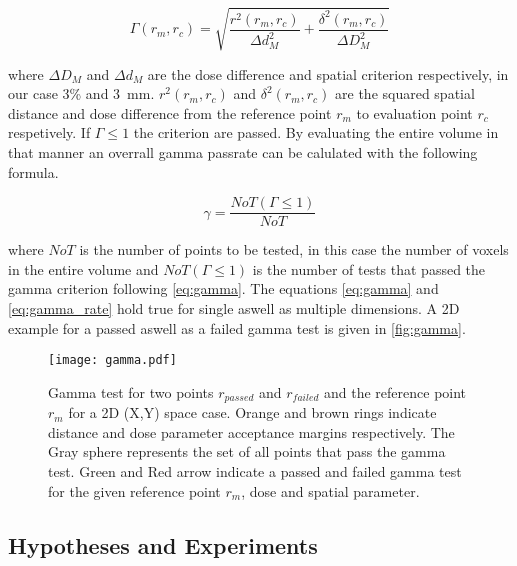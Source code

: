 \begin{equation}\label{eq:gamma}
    \Gamma (r_m, r_c) = \sqrt{\frac{r^2(r_m,r_c)}{\Delta d^2_M} + \frac{\delta ^2(r_m,r_c)}{\Delta D^2_M}}
\end{equation}

where $\Delta D_M$ and $\Delta d_M$ are the dose difference and spatial criterion respectively, in our case 3\% and 3~mm.  $r^2(r_m,r_c)$ and $\delta ^2(r_m,r_c)$ are the squared spatial distance and dose difference from the reference point $r_m$ to evaluation point $r_c$ respetively. If $\Gamma \leq 1$ the criterion are passed. By evaluating the entire volume in that manner an overrall gamma passrate can be calulated with the following formula. 

\begin{equation}\label{eq:gamma_rate}
    \gamma = \frac{NoT(\Gamma \leq 1)}{NoT}
\end{equation}

where $NoT$ is the number of points to be tested, in this case the number of voxels in the entire volume and $NoT(\Gamma \leq 1)$ is the number of tests that passed the gamma criterion following \autoref{eq:gamma}. The equations \autoref{eq:gamma} and \autoref{eq:gamma_rate} hold true for single aswell as multiple dimensions. A 2D example for a passed aswell as a failed gamma test is given in \autoref{fig:gamma}. 

\begin{figure}
    \centering
    \texttt{[image: gamma.pdf]}
    \caption{Gamma test for two points $r_{passed}$ and $r_{failed}$ and the reference point $r_m$ for a 2D (X,Y) space case. Orange and brown rings indicate distance and dose parameter acceptance margins respectively. The Gray sphere represents the set of all points that pass the gamma test. Green and Red arrow indicate a passed and failed gamma test for the given reference point $r_m$, dose and spatial parameter.}\label{fig:gamma}
\end{figure}

\subsection{Hypotheses and Experiments}

